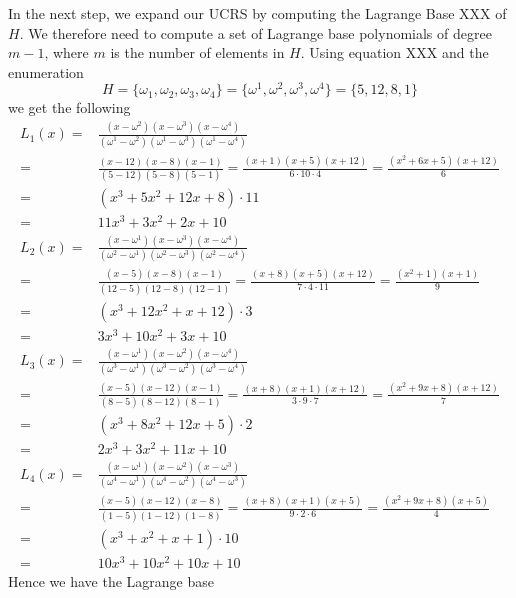 \begin{example}
In the next step, we expand our UCRS by computing the Lagrange Base XXX of $H$. We therefore need to compute a set of Lagrange base polynomials of degree $m-1$, where $m$ is the number of elements in $H$. Using equation XXX and the enumeration 
$$
H= \{\omega_1, \omega_2, \omega_3, \omega_4\} = \{\omega^1,\omega^2,\omega^3, \omega^4\} =  \{5,12,8,1\}
$$
 we get the following
\begin{equation}
\begin{array}{rl}
L_1(x) = &  \frac{(x-\omega^2)(x-\omega^3)(x-\omega^4)}{(\omega^1-\omega^2)(\omega^1-\omega^3)(\omega^1-\omega^4)}\\
       = &  \frac{(x-12)(x-8)(x-1)}{(5-12)(5-8)(5-1)}
       = \frac{(x+1)(x+5)(x+12)}{6\cdot 10\cdot 4}
       = \frac{(x^2+6x+5)(x+12)}{6} \\
       = & (x^3 +5x^2 +12x + 8)\cdot 11 \\
       = & 11x^3 +3x^2 +2x + 10\\
L_2(x) = &  \frac{(x-\omega^1)(x-\omega^3)(x-\omega^4)}{(\omega^2-\omega^1)(\omega^2-\omega^3)(\omega^2-\omega^4)}\\
       = &  \frac{(x-5)(x-8)(x-1)}{(12-5)(12-8)(12-1)}
       =    \frac{(x+8)(x+5)(x+12)}{7\cdot 4\cdot 11}
       =    \frac{(x^2+1)(x+1)}{9} \\
       = &   (x^3 +12x^2+x + 12)\cdot 3 \\
       = &  3x^3 +10x^2+ 3x + 10\\
L_3(x) = &  \frac{(x-\omega^1)(x-\omega^2)(x-\omega^4)}{(\omega^3-\omega^1)(\omega^3-\omega^2)(\omega^3-\omega^4)}\\
       = &  \frac{(x-5)(x-12)(x-1)}{(8-5)(8-12)(8-1)}
       =   \frac{(x+8)(x+1)(x+12)}{3\cdot 9\cdot 7}
       =   \frac{(x^2+9x+8)(x+12)}{7} \\
       = &   (x^3 + 8x^2 +12x +5) \cdot 2\\
       = &  2x^3 + 3x^2 +11x +10 \\
L_4(x) = &  \frac{(x-\omega^1)(x-\omega^2)(x-\omega^3)}{(\omega^4-\omega^1)(\omega^4-\omega^2)(\omega^4-\omega^3)}\\
       = &  \frac{(x-5)(x-12)(x-8)}{(1-5)(1-12)(1-8)}
       = \frac{(x+8)(x+1)(x+5)}{9\cdot 2\cdot 6}
       = \frac{(x^2 +9x + 8)(x+5)}{4} \\
       = & (x^3 + x^2 +x + 1)\cdot 10 \\
       = & 10x^3 + 10 x^2 +10x + 10
\end{array}
\end{equation}
Hence we have the Lagrange base
\begin{multline}

\end{multline}
\end{example}

